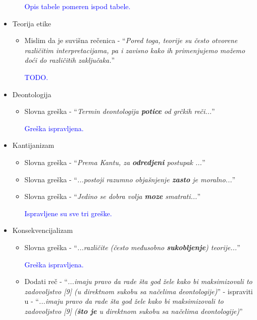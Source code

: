 \documentclass[a4paper]{report}
\newcommand{\odgovor}[1]{\textcolor{blue}{#1}}
\begin{document}
\begin{itemize}
\begin{itemize}
        \odgovor{Opis tabele pomeren ispod tabele.}
        
    \end{itemize}
    \item Teorija etike
    \begin{itemize}
        \item Mislim da je suvišna rečenica - ``\textit{Pored toga, teorije su često
otvorene različitim interpretacijama, pa i zavisno kako ih primenjujemo
možemo doći do različitih zaključaka.}''

		\odgovor{TODO.}
		
    \end{itemize}
    \item Deontologija
    \begin{itemize}
        \item Slovna greška - ``\textit{Termin deontologija \textbf{potice} od grčkih reči...}''
        
        	\odgovor{Greška ispravljena.}
        	
    \end{itemize}
    \item Kantijanizam
    \begin{itemize}
        \item Slovna greška - ``\textit{Prema Kantu, za \textbf{odredjeni} postupak ...}''
        \item Slovna greška - ``\textit{...postoji razumno
objašnjenje \textbf{zasto} je moralno...}''
        \item Slovna greška - ``\textit{Jedino se dobra volja
\textbf{moze} smatrati...}''

	\odgovor{Ispravljene su sve tri greške.}
	
    \end{itemize}
    \item Konsekvencijalizam
    \begin{itemize}
        \item Slovna greška - ``\textit{...različite (često međusobno
\textbf{sukobljenje}) teorije...}''

	\odgovor{Greška ispravljena.}
	
        \item Dodati reč - ``\textit{...imaju pravo da rade šta god žele kako bi maksimizovali to
zadovoljstvo [9] (u direktnom sukobu sa načelima deontologije)}'' - ispraviti u - ``\textit{...imaju pravo da rade šta god žele kako bi maksimizovali to
zadovoljstvo [9] (\textbf{što je} u direktnom sukobu sa načelima deontologije)}''


\end{itemize}
\end{itemize}
\end{document}
